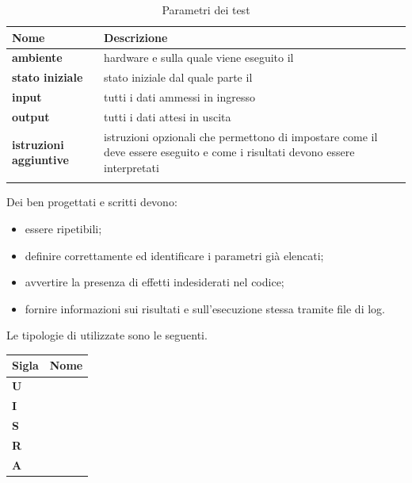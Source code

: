 {{\setlength{\freewidth}{\dimexpr\textwidth-0\tabcolsep}
	\renewcommand{\arraystretch}{1.5}
	\setlength{\aboverulesep}{0pt}
	\setlength{\belowrulesep}{0pt}
	\begin{longtable}{L{.210\freewidth} L{.6\freewidth} L{.080\freewidth}}
		\toprule 
		\textbf{Nome} & \textbf{Descrizione} \\
		\toprule
		\endhead		
		\textbf{ambiente} &  hardware e  sulla quale viene eseguito il  \\
		\textbf{stato iniziale} & stato iniziale dal quale parte il  \\
		 \textbf{input} & tutti i dati ammessi in ingresso \\
		\textbf{output} & tutti i dati attesi in uscita \\
		 \textbf{istruzioni aggiuntive} & istruzioni opzionali che permettono di impostare come il  deve essere eseguito e come i risultati devono essere interpretati \\
		\bottomrule
		\hiderowcolors
		\caption{Parametri dei test}
	\end{longtable}


Dei  ben progettati e scritti devono:
\begin{itemize}
	\item essere ripetibili;
	\item definire correttamente ed identificare i parametri già elencati;
	\item avvertire la presenza di effetti indesiderati nel codice;
	\item fornire informazioni sui risultati e sull'esecuzione stessa tramite file di log.
\end{itemize}
Le tipologie di  utilizzate sono le seguenti.

{
\setlength{\freewidth}{\dimexpr\textwidth-0\tabcolsep}
	\renewcommand{\arraystretch}{1.5}
	\setlength{\aboverulesep}{0pt}
	\setlength{\belowrulesep}{0pt}
	\begin{longtable}{L{.2\freewidth} L{0.8\freewidth}}
		\toprule 
		\textbf{Sigla} & \textbf{Nome} \\
		\toprule
		\endhead		
		\textbf{U} &  \\
		\textbf{I} &  \\
		 \textbf{S} & \\
		\textbf{R} &  \\
		 \textbf{A} &  \\


\end{longtable}}}}
